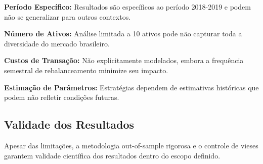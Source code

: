 \textbf{Período Específico:} Resultados são específicos ao período 2018-2019 e podem não se generalizar para outros contextos.

\textbf{Número de Ativos:} Análise limitada a 10 ativos pode não capturar toda a diversidade do mercado brasileiro.

\textbf{Custos de Transação:} Não explicitamente modelados, embora a frequência semestral de rebalanceamento minimize seu impacto.

\textbf{Estimação de Parâmetros:} Estratégias dependem de estimativas históricas que podem não refletir condições futuras.

\subsection{Validade dos Resultados}

Apesar das limitações, a metodologia out-of-sample rigorosa e o controle de vieses garantem validade científica dos resultados dentro do escopo definido.